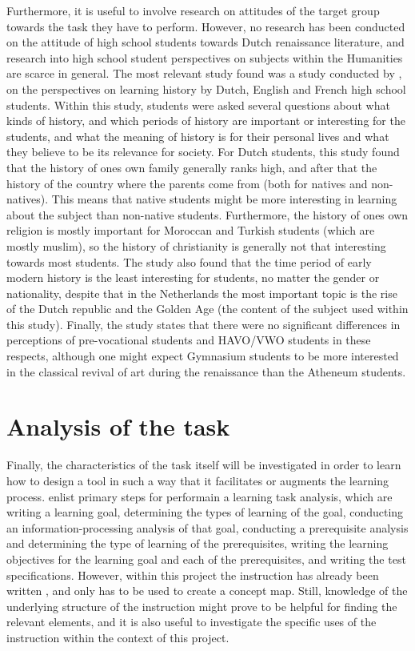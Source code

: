 Furthermore, it is useful to involve research on attitudes of the target group towards the task they have to perform. However, no research has been conducted on the attitude of high school students towards Dutch renaissance literature, and research into high school student perspectives on subjects within the Humanities are scarce in general. The most relevant study found was a study conducted by , on the perspectives on learning history by Dutch, English and French high school students. Within this study, students were asked several questions about what kinds of history, and which periods of history are important or interesting for the students, and what the meaning of history is for their personal lives and what they believe to be its relevance for society. For Dutch students, this study found that the history of ones own family generally ranks high, and after that the history of the country where the parents come from (both for natives and non-natives). This means that native students might be more interesting in learning about the subject than non-native students. Furthermore, the history of ones own religion is mostly important for Moroccan and Turkish students (which are mostly muslim), so the history of christianity is generally not that interesting towards most students. The study also found that the time period of early modern history is the least interesting for students, no matter the gender or nationality, despite that in the Netherlands the most important topic is the rise of the Dutch republic and the Golden Age (the content of the subject used within this study). Finally, the study states that there were no significant differences in perceptions of pre-vocational students and HAVO/VWO students in these respects, although one might expect Gymnasium students to be more interested in the classical revival of art during the renaissance than the Atheneum students.

\section{Analysis of the task}

Finally, the characteristics of the task itself will be investigated in order to learn how to design a tool in such a way that it facilitates or augments the learning process.  enlist primary steps for performain a learning task analysis, which are writing a learning goal, determining the types of learning of the goal, conducting an information-processing analysis of that goal, conducting a prerequisite analysis and determining the type of learning of the prerequisites, writing the learning objectives for the learning goal and each of the prerequisites, and writing the test specifications. However, within this project the instruction has already been written \cite{laagland}, and only has to be used to create a concept map. Still, knowledge of the underlying structure of the instruction might prove to be helpful for finding the relevant elements, and it is also useful to investigate the specific uses of the instruction within the context of this project.

